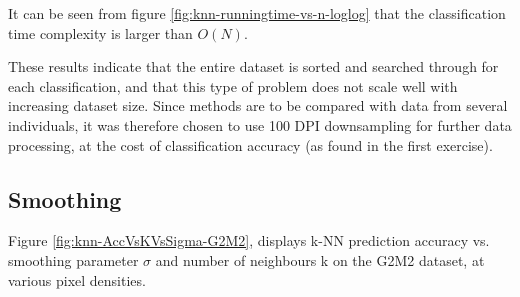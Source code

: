 It can be seen from figure \ref{fig:knn-runningtime-vs-n-loglog} that
the classification time complexity is larger than \(O(N)\).

These results indicate that the entire dataset is sorted and searched through for
each classification, and that this type of problem does not scale well with increasing
dataset size.
Since methods are to be compared with data from several individuals,
it was therefore chosen to use 100 DPI downsampling for further data processing,
at the cost of classification accuracy (as found in the first exercise).

\subsection{Smoothing}
Figure \ref{fig:knn-AccVsKVsSigma-G2M2},
displays k-NN prediction accuracy vs. smoothing parameter \(\sigma\)
and number of neighbours k on the G2M2 dataset, at various pixel densities.

